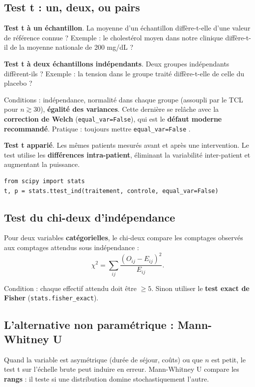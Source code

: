 \documentclass[11pt,a4paper]{article}
\begin{document}
\subsection{Test t : un, deux, ou pairs}

\textbf{Test t \`a un \'echantillon}. La moyenne d'un \'echantillon
diff\`ere-t-elle d'une valeur de r\'ef\'erence connue ?
Exemple : le cholest\'erol moyen dans notre clinique diff\`ere-t-il de la
moyenne nationale de 200 mg/dL ?

\textbf{Test t \`a deux \'echantillons ind\'ependants}. Deux groupes
ind\'ependants diff\`erent-ils ? Exemple : la tension dans le groupe
trait\'e diff\`ere-t-elle de celle du placebo ?

Conditions : ind\'ependance, normalit\'e dans chaque groupe (assoupli par
le TCL pour $n \gtrsim 30$), \textbf{\'egalit\'e des variances}. Cette
derni\`ere se rel\^ache avec la \textbf{correction de Welch}
(\texttt{equal\_var=False}), qui est le \textbf{d\'efaut moderne
recommand\'e}. Pratique : toujours mettre \texttt{equal\_var=False}
\citep{ruxton2006unequal}.

\textbf{Test t appari\'e}. Les m\^emes patients mesur\'es avant et apr\`es
une intervention. Le test utilise les \textbf{diff\'erences
intra-patient}, \'eliminant la variabilit\'e inter-patient et augmentant la
puissance.

\begin{verbatim}
from scipy import stats
t, p = stats.ttest_ind(traitement, controle, equal_var=False)
\end{verbatim}

\subsection{Test du chi-deux d'ind\'ependance}

Pour deux variables \textbf{cat\'egorielles}, le chi-deux compare les
comptages observ\'es aux comptages attendus sous ind\'ependance :
\[
\chi^2 = \sum_{ij} \frac{(O_{ij} - E_{ij})^2}{E_{ij}}.
\]

Condition : chaque effectif attendu doit \^etre $\geq 5$. Sinon utiliser
le \textbf{test exact de Fisher} (\texttt{stats.fisher\_exact}).

\subsection{L'alternative non param\'etrique : Mann-Whitney U}

Quand la variable est asym\'etrique (dur\'ee de s\'ejour, co\^uts) ou que
$n$ est petit, le test t sur l'\'echelle brute peut induire en erreur.
Mann-Whitney U compare les \textbf{rangs} : il teste si une distribution
domine stochastiquement l'autre.
\end{document}
